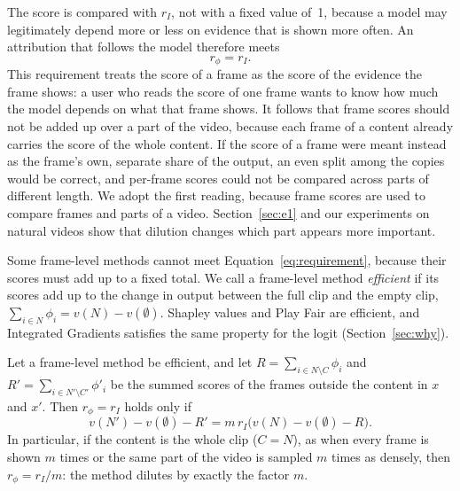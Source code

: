 The score is compared with $r_I$, not with a fixed value of~1, because a model may legitimately depend more or less on evidence that is shown more often.
An attribution that follows the model therefore meets
\begin{equation}
  r_\phi = r_I .
  \label{eq:requirement}
\end{equation}
This requirement treats the score of a frame as the score of the evidence the frame shows: a user who reads the score of one frame wants to know how much the model depends on what that frame shows.
It follows that frame scores should not be added up over a part of the video, because each frame of a content already carries the score of the whole content.
If the score of a frame were meant instead as the frame's own, separate share of the output, an even split among the copies would be correct, and per-frame scores could not be compared across parts of different length.
We adopt the first reading, because frame scores are used to compare frames and parts of a video.
Section~\ref{sec:e1} and our experiments on natural videos show that dilution changes which part appears more important.

Some frame-level methods cannot meet Equation~\ref{eq:requirement}, because their scores must add up to a fixed total.
We call a frame-level method \emph{efficient} if its scores add up to the change in output between the full clip and the empty clip, $\sum_{i \in N} \phi_i = v(N) - v(\emptyset)$.
Shapley values and Play Fair are efficient, and Integrated Gradients satisfies the same property for the logit (Section~\ref{sec:why}).

\begin{proposition}
\label{prop:conflict}
Let a frame-level method be efficient, and let $R = \sum_{i \in N \setminus C} \phi_i$ and $R' = \sum_{i \in N' \setminus C'} \phi'_i$ be the summed scores of the frames outside the content in $x$ and $x'$.
Then $r_\phi = r_I$ holds only if
\begin{equation}
  v(N') - v(\emptyset) - R' = m\, r_I \bigl( v(N) - v(\emptyset) - R \bigr).
\end{equation}
In particular, if the content is the whole clip ($C = N$), as when every frame is shown $m$ times or the same part of the video is sampled $m$ times as densely, then $r_\phi = r_I / m$: the method dilutes by exactly the factor $m$.
\end{proposition}

